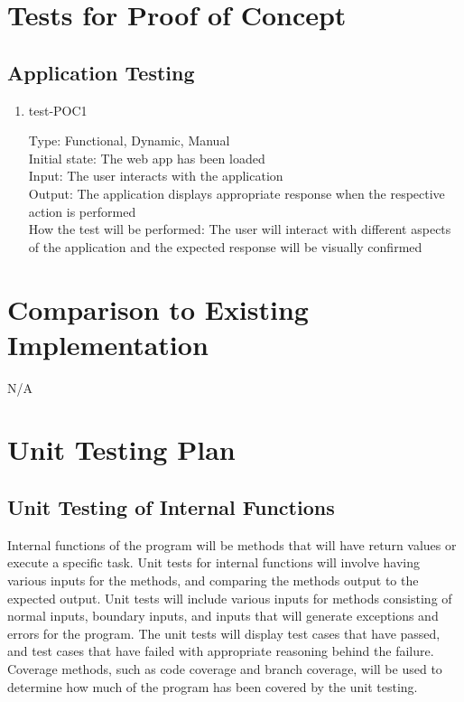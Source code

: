 \documentclass[12pt, titlepage]{article}
\begin{document}
\section{Tests for Proof of Concept}

\subsection{Application Testing}

\begin{enumerate}
\item{test-POC1\\}

Type: Functional, Dynamic, Manual\\
Initial state: The web app has been loaded\\
Input: The user interacts with the application\\
Output: The application displays appropriate response when the respective action is performed\\
How the test will be performed: The user will interact with different aspects of the application and the expected response will be visually confirmed
\end{enumerate}

\section{Comparison to Existing Implementation}
N/A

\section{Unit Testing Plan}

\subsection{Unit Testing of Internal Functions}

Internal functions of the program will be methods that will have return values or execute a specific task. Unit tests for internal functions will involve having various inputs for the methods, and comparing the methods output to the expected output. Unit tests will include various inputs for methods consisting of normal inputs, boundary inputs, and inputs that will generate exceptions and errors for the program. The unit tests will display test cases that have passed, and test cases that have failed with appropriate reasoning behind the failure. Coverage methods, such as code coverage and branch coverage, will be used to determine how much of the program has been covered by the unit testing.
\end{document}
